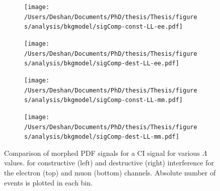 \begin{figure}[h!]
    \centering
    \begin{subfigure}[b]{0.49\textwidth}
        \centering
        \texttt{[image: /Users/Deshan/Documents/PhD/thesis/Thesis/figures/analysis/bkgmodel/sigComp-const-LL-ee.pdf]}
        \label{fig:bkgmodel:Morphee1}
    \end{subfigure}
    \begin{subfigure}[b]{0.49\textwidth}
        \centering
        \texttt{[image: /Users/Deshan/Documents/PhD/thesis/Thesis/figures/analysis/bkgmodel/sigComp-dest-LL-ee.pdf]}
        \label{fig:bkgmodel:Morphee2}
    \end{subfigure}
    \begin{subfigure}[b]{0.49\textwidth}
        \centering
        \texttt{[image: /Users/Deshan/Documents/PhD/thesis/Thesis/figures/analysis/bkgmodel/sigComp-const-LL-mm.pdf]}
        \label{fig:bkgmodel:Morphmm1}
    \end{subfigure}
    \begin{subfigure}[b]{0.49\textwidth}
        \centering
        \texttt{[image: /Users/Deshan/Documents/PhD/thesis/Thesis/figures/analysis/bkgmodel/sigComp-dest-LL-mm.pdf]}
        \label{fig:bkgmodel:Morphmm2}
    \end{subfigure}
    \caption[Morphed signal PDF produced at various $\Lambda$ values compared with the reweighted MC template.]{Comparison of morphed PDF signals for a CI signal for various $\Lambda$ values. for constructive (left) and destructive (right) interference for the electron (top) and muon (bottom) channels. Absolute number of events is plotted in each bin.}
    \label{fig:bkgmodel:Morph}
\end{figure}

